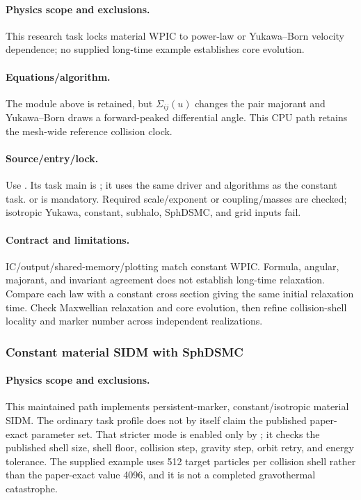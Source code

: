\paragraph{Physics scope and exclusions.}
This research task locks material WPIC to power-law or Yukawa--Born velocity
dependence; no supplied long-time example establishes core evolution.
\paragraph{Equations/algorithm.}
The module above is retained, but \(\Sigma_{ij}(u)\) changes the pair majorant
and Yukawa--Born draws a forward-peaked differential angle.  This CPU path
retains the mesh-wide reference collision clock.
\paragraph{Source/entry/lock.}
Use .  Its task main is
; it uses the same
 driver and
 algorithms as the
constant task.   or  is mandatory.  Required
scale/exponent or coupling/masses are checked; isotropic Yukawa, constant,
subhalo, SphDSMC, and grid inputs fail.
\paragraph{Contract and limitations.}
IC/output/shared-memory/plotting match constant WPIC.  Formula, angular,
majorant, and invariant agreement does not establish long-time relaxation.
Compare each law with a constant cross section giving the same initial
relaxation time. Check Maxwellian relaxation and core evolution, then refine
collision-shell locality and marker number across independent realizations.

\subsubsection{Constant material SIDM with SphDSMC}
\paragraph{Physics scope and exclusions.}
This maintained path implements persistent-marker, constant/isotropic
material SIDM.  The ordinary task profile does not by itself claim the
published paper-exact parameter set.  That stricter mode is enabled only by
; it checks the published shell size,
shell floor, collision step, gravity step, orbit retry, and energy tolerance.
The supplied example uses 512 target particles per collision shell rather
than the paper-exact value 4096, and it is not a completed gravothermal
catastrophe.

